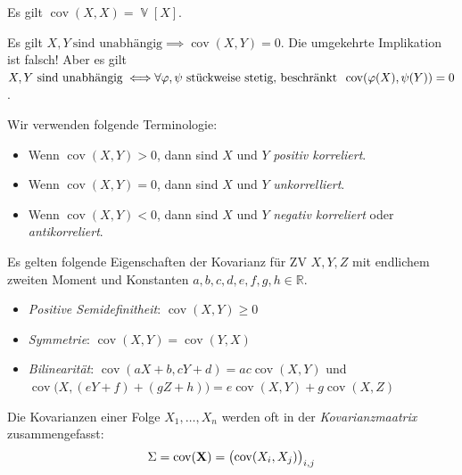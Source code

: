 \documentclass[a4paper,10pt]{article}
\def\R{\mathbb{R}}
\DeclareMathOperator{\E}{\mathbb{E}}
\DeclareMathOperator{\V}{\mathbb{V}}
\DeclareMathOperator{\cov}{cov}
\numberwithin{equation}{section}
\begin{document}

Es gilt \( \cov(X, X) = \V[X] \).

Es gilt \(X, Y \ \text{sind unabhängig} \implies \cov(X, Y) = 0 \).
Die umgekehrte Implikation ist falsch! Aber es gilt \( X, Y \ \text{sind unabhängig} \iff \\ \forall \varphi, \psi \ \text{stückweise stetig, beschränkt} \ \: \cov(\varphi(X), \psi(Y)) = 0 \).

Wir verwenden folgende Terminologie:
\begin{itemize}
    \item Wenn \( \cov(X, Y) > 0 \), dann sind \( X \) und \( Y \) \emph{positiv korreliert}.
    \item Wenn \( \cov(X, Y) = 0 \), dann sind \( X \) und \( Y \) \emph{unkorrelliert}.
    \item Wenn \( \cov(X, Y) < 0 \), dann sind \( X \) und \( Y \) \emph{negativ korreliert} oder \emph{antikorreliert}.
\end{itemize}

Es gelten folgende Eigenschaften der Kovarianz für ZV \( X, Y, Z \) mit endlichem zweiten Moment und Konstanten \( a, b, c, d, e, f, g, h \in \R \).
\begin{itemize}
    \item \emph{Positive Semidefinitheit}: \( \cov(X, Y) \geq 0 \)
    \item \emph{Symmetrie}: \( \cov(X, Y) = \cov(Y, X) \)
    \item \emph{Bilinearität}: \( \cov(aX + b, cY + d) = ac \cov(X, Y) \) und \( \cov\big(X, (eY + f) + (gZ + h)\big) = e \cov(X, Y) + g \cov(X, Z) \)
\end{itemize}

Die Kovarianzen einer Folge \( X_1, \dots, X_n \) werden oft in der \emph{Kovarianzmaatrix} zusammengefasst:
\[
    \Sigma = \cov(\mathbf{X}) \\ = \begin{pmatrix} \cov(X_i, X_j) \end{pmatrix}_{i, j}
\]
\end{document}
